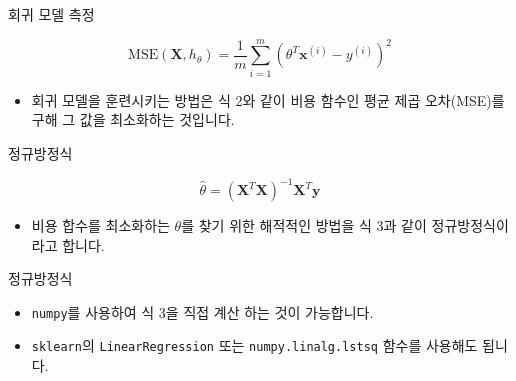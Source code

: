 \documentclass{beamer}
\numberwithin{equation}{section}
\begin{document}

\begin{frame}{회귀 모델 측정}

\begin{equation}
\textrm{MSE}(\mathbf{X}, h_{\theta}) = \dfrac{1}{m} \sum_{i=1}^{m} \left( \theta^{T}\mathbf{x}^{(i)} - y^{(i)} \right)^{2}
\end{equation}
    
\vskip 1cm

\begin{itemize}
\item 회귀 모델을 훈련시키는 방법은 식 2와 같이 비용 함수인 평균 제곱 오차(MSE)를 구해 그 값을 최소화하는 것입니다.
\end{itemize}

\end{frame}


\begin{frame}{정규방정식}

\begin{equation}
\hat{\theta} = \left( \mathbf{X}^{T} \mathbf{X} \right)^{-1} \mathbf{X}^{T} \mathbf{y}
\end{equation}

\vskip 1cm

\begin{itemize}
\item 비용 합수를 최소화하는 $\theta$를 찾기 위한 해적적인 방법을 식 3과 같이 정규방정식이라고 합니다.
\end{itemize}

\end{frame}


\begin{frame}{정규방정식}



\vskip 1cm

\begin{itemize}
\item \texttt{numpy}를 사용하여 식 3을 직접 계산 하는 것이 가능합니다.
\vskip 0.25cm
\item \texttt{sklearn}의 \texttt{LinearRegression} 또는 \texttt{numpy.linalg.lstsq} 함수를 사용해도 됩니다.
\end{itemize}   

\end{frame}
\end{document}
